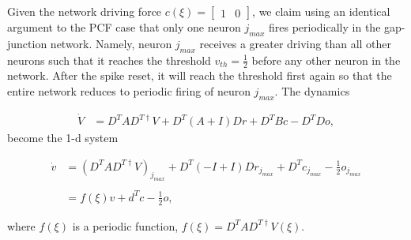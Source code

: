 
Given the network driving force $c(\xi) = \begin{bmatrix}
1 & 0
\end{bmatrix}$, 
we claim using an identical argument to the PCF case that only one neuron $j_{max}$ fires periodically in the gap-junction network. Namely, neuron $j_{max}$ receives a greater driving than all other neurons such that it reaches the threshold $v_{th} = \frac{1}{2}$ before any other neuron in the network. After the spike reset, it will reach the threshold first again so that the entire network reduces to periodic firing of neuron $j_{max}$. The dynamics

\begin{align*}
\dot{V}
&= 
D^T A
D^{T \dagger} V 
+
D^T
\left(
	A + I 
\right)
D r
+ 
D^T B c
- D^T D o,
\end{align*}
become the 1-d system

\begin{align*}
\dot{v}
&= 
\left(
D^T A
D^{T \dagger} V 
\right)
_{j_{max}}
+
D^T
\left(
	-I + I 
\right)
D r_{j_{max}}
+ 
D^T c_{j_{max}}
- \frac{1}{2} o_{j_{max}}
%
\\
\\
%
&= 
f(\xi) v
+
d^T c - \frac{1}{2} o,
\end{align*}

where $f(\xi)$ is a periodic function, $f(\xi) = D^T A D^{T \dagger} V(\xi)$.


